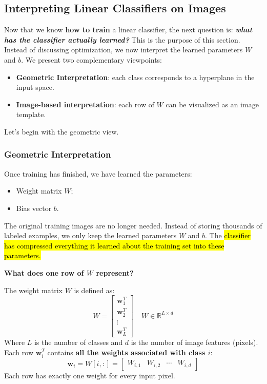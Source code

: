 \subsection{Interpreting Linear Classifiers on Images}\label{sec:interpreting-linear-classifiers-on-images}

Now that we know \textbf{how to train} a linear classifier, the next question is: \emph{\textbf{what has the classifier actually learned?}} This is the purpose of this section. Instead of discussing optimization, we now interpret the learned parameters $W$ and $b$. We present two complementary viewpoints:
\begin{itemize}
    \item \textbf{Geometric Interpretation}: each class corresponds to a hyperplane in the input space.
    \item \textbf{Image-based interpretation}: each row of $W$ can be visualized as an image template.
\end{itemize}
Let's begin with the geometric view.

\longline

\subsubsection{Geometric Interpretation}\label{sec:geometric-interpretation}

Once training has finished, we have learned the parameters:
\begin{itemize}
    \item Weight matrix $W$;
    \item Bias vector $b$.
\end{itemize}
The original training images are no longer needed. Instead of storing thousands of labeled examples, we only keep the learned parameters $W$ and $b$. The \hl{classifier has compressed everything it learned about the training set into these parameters.}

\highspace
\begin{flushleft}
    \textcolor{Green3}{ \textbf{What does one row of $W$ represent?}}
\end{flushleft}
The weight matrix $W$ is defined as:
\begin{equation*}
    W = \begin{bmatrix}
        \mathbf{w}_{1}^{T} \\
        \mathbf{w}_{2}^{T} \\
        \vdots \\
        \mathbf{w}_{L}^{T}
    \end{bmatrix}
    \quad
    W \in \mathbb{R}^{L \times d}
\end{equation*}
Where $L$ is the number of classes and $d$ is the number of image features (pixels). Each row $\mathbf{w}_{i}^{T}$ contains \textbf{all the weights associated with class $i$}:
\begin{equation*}
    \mathbf{w}_{i} = W\left[i, :\right] = \begin{bmatrix}
        W_{i, 1} & W_{i, 2} & \cdots & W_{i, d}
    \end{bmatrix}
\end{equation*}
Each row has exactly one weight for every input pixel.

